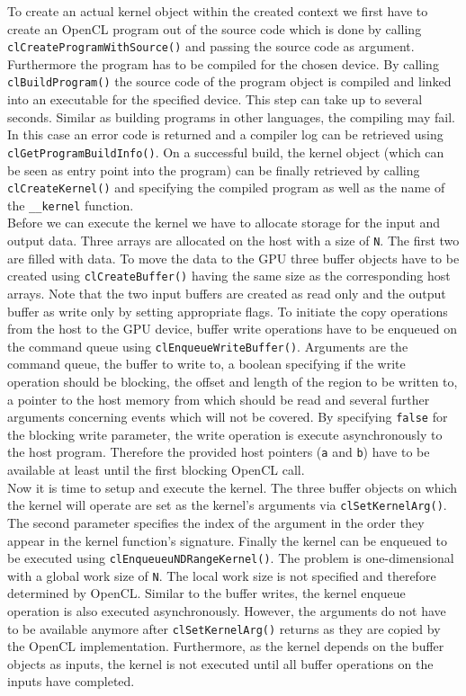 To create an actual kernel object within the created context we first have to create an OpenCL program out of the source code which is done by calling \lstinline!clCreateProgramWithSource()! and passing the source code as argument. Furthermore the program has to be compiled for the chosen device. By calling \lstinline!clBuildProgram()! the source code of the program object is compiled and linked into an executable for the specified device. This step can take up to several seconds. Similar as building programs in other languages, the compiling may fail. In this case an error code is returned and a compiler log can be retrieved using \lstinline!clGetProgramBuildInfo()!.
On a successful build, the kernel object (which can be seen as entry point into the program) can be finally retrieved by calling \lstinline!clCreateKernel()! and specifying the compiled program as well as the name of the \lstinline!__kernel! function. \\
Before we can execute the kernel we have to allocate storage for the input and output data. Three arrays are allocated on the host with a size of \lstinline!N!. The first two are filled with data. To move the data to the GPU three buffer objects have to be created using \lstinline!clCreateBuffer()! having the same size as the corresponding host arrays. Note that the two input buffers are created as read only and the output buffer as write only by setting appropriate flags. To initiate the copy operations from the host to the GPU device, buffer write operations have to be enqueued on the command queue using \lstinline!clEnqueueWriteBuffer()!. Arguments are the command queue, the buffer to write to, a boolean specifying if the write operation should be blocking, the offset and length of the region to be written to, a pointer to the host memory from which should be read and several further arguments concerning events which will not be covered. By specifying \lstinline!false! for the blocking write parameter, the write operation is execute asynchronously to the host program. Therefore the provided host pointers (\lstinline!a! and \lstinline!b!) have to be available at least until the first blocking OpenCL call. \\
Now it is time to setup and execute the kernel. The three buffer objects on which the kernel will operate are set as the kernel's arguments via \lstinline!clSetKernelArg()!. The second parameter specifies the index of the argument in the order they appear in the kernel function's signature. Finally the kernel can be enqueued to be executed using \lstinline!clEnqueueuNDRangeKernel()!. The problem is one-dimensional with a global work size of \lstinline!N!. The local work size is not specified and therefore determined by OpenCL. Similar to the buffer writes, the kernel enqueue operation is also executed asynchronously. However, the arguments do not have to be available anymore after \lstinline!clSetKernelArg()! returns as they are copied by the OpenCL implementation. Furthermore, as the kernel depends on the buffer objects as inputs, the kernel is not executed until all buffer operations on the inputs have completed. \\
